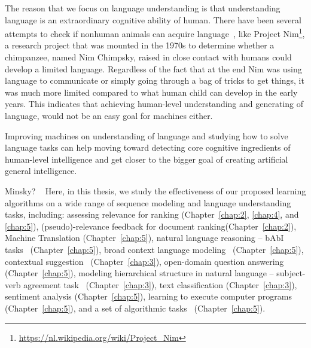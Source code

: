The reason that we focus on language understanding is that understanding language is an extraordinary cognitive ability of human. 
%
There have been several attempts to check if nonhuman animals can acquire language~\citep{pepperberg2017animal}, like Project Nim\footnote{\url{https://nl.wikipedia.org/wiki/Project_Nim}}, a research project that was mounted in the 1970s to determine whether a chimpanzee, named Nim Chimpsky, raised in close contact with humans could develop a limited language. Regardless of the fact that at the end Nim was using language to communicate or simply going through a bag of tricks to get things, it was much more limited compared to what human child can develop in the early years. 
%
This indicates that achieving human-level understanding and generating of language, would not be an easy goal for machines either.

Improving machines on understanding of language and studying how to solve language tasks can help moving toward detecting core cognitive ingredients of human-level intelligence and get closer to the bigger goal of creating artificial general intelligence.

Minsky? ~
Here, in this thesis, we study the effectiveness of our proposed learning algorithms on a wide range of sequence modeling and language understanding tasks, including:
% 
assessing relevance for ranking (Chapter~\ref{chap:2}, \ref{chap:4}, and \ref{chap:5}), 
%
(pseudo)-relevance feedback for document ranking(Chapter~\ref{chap:2}), 
%
Machine Translation (Chapter~\ref{chap:5}), 
%
natural language reasoning -- bAbI tasks~\citep{weston2015towards} (Chapter~\ref{chap:5}), 
%
broad context language modeling~\citep{paperno2016lambada} (Chapter~\ref{chap:5}), 
%
contextual suggestion~\citep{hashemioverview} (Chapter~\ref{chap:3}), 
%
open-domain question answering (Chapter~\ref{chap:5}), 
%
modeling hierarchical structure in natural language -- subject-verb agreement task~\citep{linzen2016assessing} (Chapter~\ref{chap:3}), 
%
text classification (Chapter~\ref{chap:3}), 
%
sentiment analysis (Chapter~\ref{chap:5}), 
%
learning to execute computer programs~\citep{ZS14} (Chapter~\ref{chap:5}), 
%
and a set of algorithmic tasks~\citep{neural_gpu} (Chapter~\ref{chap:5}).

